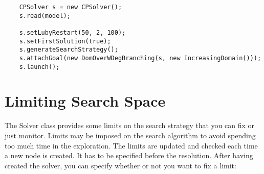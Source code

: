 \begin{lstlisting}
	CPSolver s = new CPSolver();
	s.read(model);
	
	s.setLubyRestart(50, 2, 100);
	s.setFirstSolution(true);
	s.generateSearchStrategy();
	s.attachGoal(new DomOverWDegBranching(s, new IncreasingDomain()));
	s.launch();
\end{lstlisting}

\section{Limiting Search Space}\label{solver:limitingsearchspace}\hypertarget{solver:limitingsearchspace}{}
The Solver class provides some limits on the search strategy that you can fix or just monitor.
Limits may be imposed on the search algorithm to avoid spending too much time in the exploration. The limits are updated and checked each time a new node is created. It has to be specified before the resolution. 
After having created the solver, you can specify whether or not you want to fix a limit:

